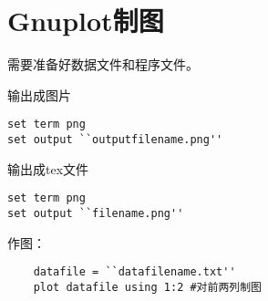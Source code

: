 \section{Gnuplot制图}
 需要准备好数据文件和程序文件。

输出成图片
\begin{lstlisting}
set term png
set output ``outputfilename.png''
\end{lstlisting}

输出成tex文件
\begin{lstlisting}
set term png
set output ``filename.png''
\end{lstlisting}

作图：
\begin{lstlisting}
    datafile = ``datafilename.txt''
    plot datafile using 1:2 #对前两列制图
\end{lstlisting}

